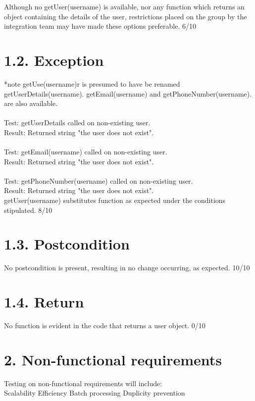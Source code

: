 \documentclass[]{report}
\begin{document}
		\noindent Although no getUser(username) is available, nor any function which returns an object containing the details of the user, restrictions placed on the group by the integration team may have made these options preferable.
		6/10
		
	\section*{1.2. Exception}
		*note getUse(username)r is presumed to have be renamed getUserDetails(username). getEmail(username) and getPhoneNumber(username). are also available.\\ \\
		
		\noindent Test: getUserDetails called on non-existing user.\\
		Result: Returned string "the user does not exist".\\\\
		Test: getEmail(username) called on non-existing user.\\
		Result: Returned string "the user does not exist".\\\\
		Test: getPhoneNumber(username) called on non-existing user.\\
		Result: Returned string "the user does not exist".\\
		
		\noindent getUser(username) substitutes function as expected under the conditions stipulated.
		8/10
		
	\section*{1.3. Postcondition}
		No postcondition is present, resulting in no change occurring, as expected.
		10/10
		
	\section*{1.4. Return}
		No function is evident in the code that returns a user object.
		0/10
		
	\section*{2. Non-functional requirements}
		Testing on non-functional requirements will include:\\
		\indent Scalability
		\indent Efficiency
		\indent Batch processing
		\indent Duplicity prevention
		
\end{document}
